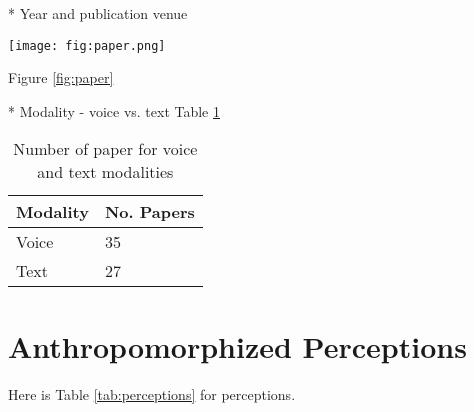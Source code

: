 \documentclass[sigconf,screen,review, anonymous]{acmart}
\begin{document}
* Year and publication venue

\begin{figure*}[h]
  \centering
  \texttt{[image: fig:paper.png]}
  \caption{Stacked barchart of number of papers by year and venue}
  \label{fig:paper}
\end{figure*}

Figure \ref{fig:paper}


\newline
* Modality - voice vs. text Table \ref{tab:modality}

\begin{table}[]
\begin{tabular}{@{}ll@{}}
\toprule
\textbf{Modality} & \textbf{No. Papers} \\ \midrule
Voice             & 35                  \\
Text              & 27                  \\ \bottomrule
\end{tabular}%
\caption{Number of paper for voice and text modalities}
\label{tab:modality}
\end{table}

\section{Anthropomorphized Perceptions}

Here is Table \ref{tab:perceptions} for perceptions.
\end{document}
